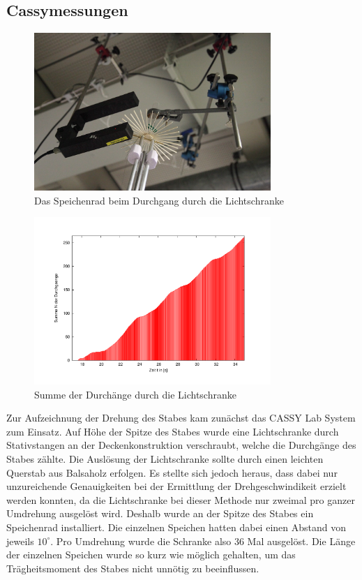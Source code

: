 \documentclass[11pt]{scrartcl}
\begin{document}
\subsection{Cassymessungen} %
\begin{figure}[ht]
\begin{center}
\includegraphics[width=0.8\textwidth]{lichtschranke.jpg}
\end{center}
\vspace{-1.5\baselineskip}
\caption{Das Speichenrad beim Durchgang durch die Lichtschranke}
\label{lichtschranke}
\end{figure}
\begin{figure}[th]
\begin{center}
\includegraphics[width=0.8\textwidth]{durchg29-cassy.pdf}
\end{center}
\vspace{-1.5\baselineskip}
\caption{Summe der Durch\"ange durch die Lichtschranke}
\label{durchg29-cassy}
\end{figure}
Zur Aufzeichnung der Drehung des Stabes kam zun\"achst das CASSY Lab System zum Einsatz. Auf H\"ohe der Spitze des Stabes wurde eine Lichtschranke durch Stativstangen an der Deckenkonstruktion verschraubt, welche die Durchg\"ange des Stabes z\"ahlte. Die Ausl\"osung der Lichtschranke sollte durch einen leichten Querstab aus Balsaholz erfolgen. Es stellte sich jedoch heraus, dass dabei nur unzureichende Genauigkeiten bei der Ermittlung der Drehgeschwindikeit erzielt werden konnten, da die Lichtschranke bei dieser Methode nur zweimal pro ganzer Umdrehung ausgel\"ost wird. Deshalb wurde an der Spitze des Stabes ein \glqq Speichenrad\grqq{} installiert. Die einzelnen Speichen hatten dabei einen Abstand von jeweils $10^\circ$. Pro Umdrehung wurde die Schranke also 36 Mal ausgel\"ost. Die L\"ange der einzelnen Speichen wurde so kurz wie m\"oglich gehalten, um das Tr\"agheitsmoment des Stabes nicht unn\"otig zu beeinflussen.
\end{document}
